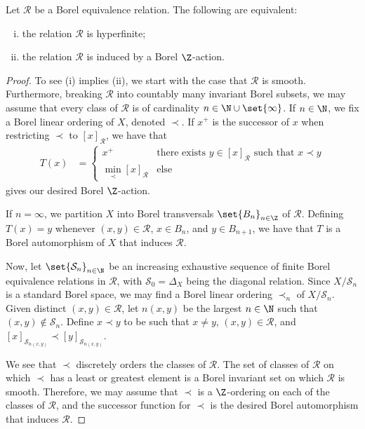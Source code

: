 \documentclass[10pt]{mypackage}
\begin{document}
\begin{theorem}
  Let $\mathcal{R}$ be a Borel equivalence relation. The following are equivalent:
  \begin{enumerate}[(i)]
    \item the relation $\mathcal{R}$ is hyperfinite;
    \item the relation $\mathcal{R}$ is induced by a Borel $\Z$-action.
  \end{enumerate}
\end{theorem}
\begin{proof}
  To see (i) implies (ii), we start with the case that $\mathcal{R}$ is smooth. Furthermore, breaking $\mathcal{R}$ into countably many invariant Borel subsets, we may assume that every class of $\mathcal{R}$ is of cardinality $n\in \N\cup\set{\infty}$. If $n\in \N$, we fix a Borel linear ordering of $X$, denoted $\prec$. If $x^{+}$ is the successor of $x$ when restricting $\prec$ to $\left[ x \right]_{\mathcal{R}}$, we have that
  \begin{align*}
    T(x) &= \begin{cases}
      x^{+} & \text{there exists $y\in \left[ x \right]_{\mathcal{R}}$ such that $x \prec y$}\\
      \min_{\prec}\left[ x \right]_{\mathcal{R}} & \text{else}
    \end{cases}
  \end{align*}
  gives our desired Borel $\Z$-action.

  If $n = \infty$, we partition $X$ into Borel transversals $\set{B_n}_{n\in \Z}$ of $\mathcal{R}$. Defining $T(x) = y$ whenever $\left( x,y \right)\in \mathcal{R}$, $x\in B_n$, and $y\in B_{n+1}$, we have that $T$ is a Borel automorphism of $X$ that induces $\mathcal{R}$.

  Now, let $\set{\mathcal{S}_n}_{n\in \N}$ be an increasing exhaustive sequence of finite Borel equivalence relations in $\mathcal{R}$, with $\mathcal{S}_0 = \Delta_{X}$ being the diagonal relation. Since $X/\mathcal{S}_n$ is a standard Borel space, we may find a Borel linear ordering $\prec_n$ of $X/\mathcal{S}_n$. Given distinct $\left( x,y \right)\in \mathcal{R}$, let $n\left( x,y \right)$ be the largest $n\in \N$ such that $\left( x,y \right)\notin \mathcal{S}_n$. Define $x \prec y$ to be such that $x\neq y$, $\left( x,y \right)\in \mathcal{R}$, and $\left[ x \right]_{\mathcal{S}_{n\left( x,y \right)}}\prec \left[ y \right]_{\mathcal{S}_{n\left( x,y \right)}}$.

  We see that $\prec$ discretely orders the classes of $\mathcal{R}$. The set of classes of $\mathcal{R}$ on which $\prec$ has a least or greatest element is a Borel invariant set on which $\mathcal{R}$ is smooth. Therefore, we may assume that $\prec$ is a $\Z$-ordering on each of the classes of $\mathcal{R}$, and the successor function for $\prec$ is the desired Borel automorphism that induces $\mathcal{R}$.


\end{proof}
\end{document}
